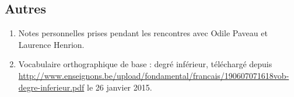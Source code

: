 \subsection*{Autres}
\begin{enumerate}
\item Notes personnelles prises pendant les rencontres avec Odile Paveau et Laurence Henrion.

\item Vocabulaire orthographique de base : degré inférieur, téléchargé depuis \url{http://www.enseignons.be/upload/fondamental/francais/190607071618vob-degre-inferieur.pdf} le 26 janvier 2015.
\end{enumerate}